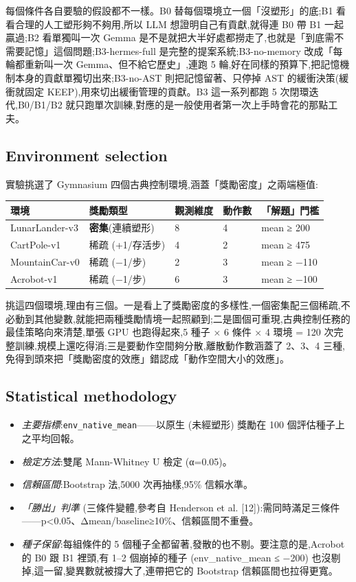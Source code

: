 \documentclass[conference,onecolumn,letterpaper,10pt]{IEEEtran}
\providecommand{\tightlist}{\setlength{\itemsep}{0pt}\setlength{\parskip}{0pt}}
\begin{document}
每個條件各自要驗的假設都不一樣。B0 替每個環境立一個「沒塑形」的底;B1 看看合理的人工塑形夠不夠用,所以 LLM 想證明自己有貢獻,就得連 B0 帶 B1 一起贏過;B2 看單獨叫一次 Gemma 是不是就把大半好處都撈走了,也就是「到底需不需要記憶」這個問題;B3-hermes-full 是完整的提案系統;B3-no-memory 改成「每輪都重新叫一次 Gemma、但不給它歷史」,連跑 5 輪,好在同樣的預算下,把記憶機制本身的貢獻單獨切出來;B3-no-AST 則把記憶留著、只停掉 AST 的緩衝決策(緩衝就固定 KEEP),用來切出緩衝管理的貢獻。B3 這一系列都跑 5 次閉環迭代,B0/B1/B2 就只跑單次訓練,對應的是一般使用者第一次上手時會花的那點工夫。

\subsection{Environment selection}

實驗挑選了 Gymnasium 四個古典控制環境,涵蓋「獎勵密度」之兩端極值:

\begin{table}[t]
\centering
\small
\begin{tabular}{@{}lllll@{}}
\toprule
環境 & 獎勵類型 & 觀測維度 & 動作數 & 「解題」門檻 \\
\midrule
LunarLander-v3 & \textbf{密集}(連續塑形) & 8 & 4 & mean ≥ 200 \\
CartPole-v1 & 稀疏 (+1/存活步) & 4 & 2 & mean ≥ 475 \\
MountainCar-v0 & 稀疏 (−1/步) & 2 & 3 & mean ≥ −110 \\
Acrobot-v1 & 稀疏 (−1/步) & 6 & 3 & mean ≥ −100 \\
\bottomrule
\end{tabular}
\end{table}


挑這四個環境,理由有三個。一是看上了獎勵密度的多樣性,一個密集配三個稀疏,不必動到其他變數,就能把兩種獎勵情境一起照顧到;二是圖個可重現,古典控制任務的最佳策略向來清楚,單張 GPU 也跑得起來,5 種子 × 6 條件 × 4 環境 = 120 次完整訓練,規模上還吃得消;三是要動作空間夠分散,離散動作數涵蓋了 2、3、4 三種,免得到頭來把「獎勵密度的效應」錯認成「動作空間大小的效應」。

\subsection{Statistical methodology}

\begin{itemize}
\tightlist
\item
  \emph{主要指標}:\texttt{env\_native\_mean}------以原生 (未經塑形) 獎勵在 100 個評估種子上之平均回報。
\item
  \emph{檢定方法}:雙尾 Mann-Whitney U 檢定 (α=0.05)。
\item
  \emph{信賴區間}:Bootstrap 法,5000 次再抽樣,95\% 信賴水準。
\item
  \emph{「勝出」判準} (三條件變體,參考自 Henderson et al. {[}12{]}):需同時滿足三條件------p\textless0.05、\textbar Δmean\textbar/\textbar baseline\textbar≥10\%、信賴區間不重疊。
\item
  \emph{種子保留}:每組條件的 5 個種子全都留著,發散的也不剔。要注意的是,Acrobot 的 B0 跟 B1 裡頭,有 1--2 個崩掉的種子 (env\_native\_mean ≤ −200) 也沒剔掉,這一留,變異數就被撐大了,連帶把它的 Bootstrap 信賴區間也拉得更寬。
\end{itemize}
\end{document}
